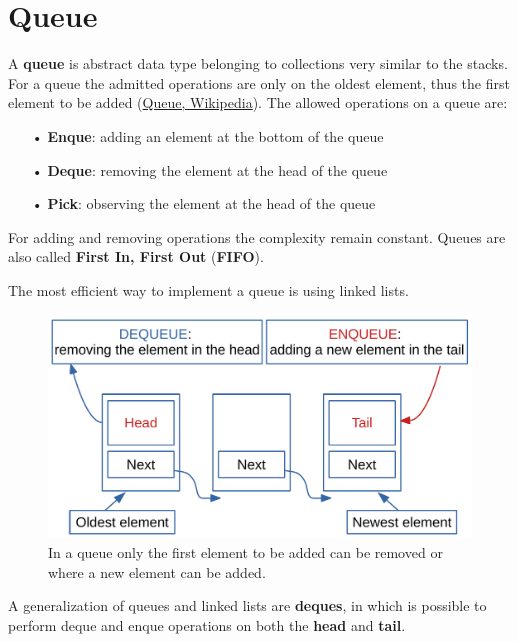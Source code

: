 \section{Queue}
A \textbf{queue} is abstract data type belonging to collections very similar to the stacks. For a queue the admitted operations are only on the oldest element, thus the first element to be added \cite{wikiqueue} (\href{https://en.wikipedia.org/wiki/Queue_(abstract_data_type)}{Queue, Wikipedia}). The allowed operations on a queue are:
\begin{itemize}
\item[•] \textbf{Enque}: adding an element at the bottom of the queue
\item[•] \textbf{Deque}: removing the element at the head of the queue
\item[•] \textbf{Pick}: observing the element at the head of the queue
\end{itemize}
For adding and removing operations the complexity remain constant. Queues are also called \textbf{First In, First Out} (\textbf{FIFO}). 

The most efficient way to implement a queue is using linked lists.

\begin{figure}[H]
	\begin{center}
		\includegraphics[scale=.6]{chapters/datastructures/images/queue_1.pdf}
		\caption[Allowed operations on queue elements.]{In a queue only the first element to be added can be removed or where a new element can be added.}
		\label{queue_1}
	\end{center}
\end{figure}

A generalization of queues and linked lists are \textbf{deques}, in which is possible to perform deque and enque operations on both the \textbf{head} and \textbf{tail}.

